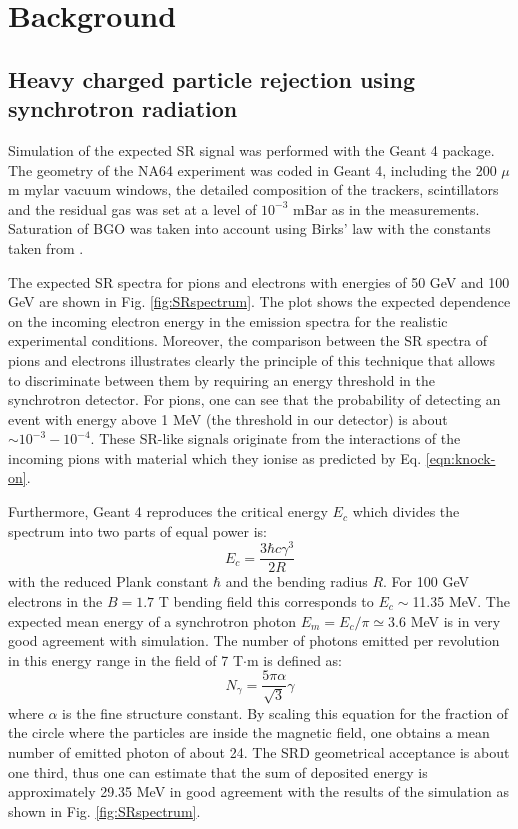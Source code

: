 \section{Background}
\label{ch3:sec:bkg}

\subsection{Heavy charged particle rejection using synchrotron radiation}
\label{ch3:sec:bkg-srd}

Simulation of the expected SR signal was performed with the Geant 4 package\cite{ALLISON2016186,1610988,AGOSTINELLI2003250}.
The geometry of the NA64 experiment was coded in Geant 4, including the 200 $\mu$m mylar vacuum windows, the detailed composition of the trackers, scintillators and the residual gas was set at a level of $10^{-3}$ mBar as in the measurements. Saturation of BGO was taken into account using Birks' law with the constants taken from \cite{AVDEICHIKOV2002251}.

The expected SR spectra for pions and electrons with energies of 50 GeV and 100 GeV are shown in Fig. \ref{fig:SRspectrum}. The plot shows the expected dependence on the incoming electron energy in the emission spectra for the realistic experimental conditions.
Moreover, the comparison between the SR spectra of pions and electrons illustrates clearly the principle of this technique that allows to discriminate between them by requiring an energy threshold in the synchrotron detector. 
For pions, one can see that the probability of detecting an event with energy above 1 MeV (the threshold in our detector) is about $\sim 10^{-3}-10^{-4}$.
These SR-like signals originate from the interactions of the incoming pions with material which they ionise as predicted by Eq. \ref{eqn:knock-on}.
 \par 
Furthermore, Geant 4 reproduces the critical energy $E_c$ which divides the spectrum into two parts of equal power is:
\begin{equation}
E_c = \frac{3 \hbar c \gamma^3}{2R}
\end{equation}
with the reduced Plank constant $\hbar$ and the bending radius $R$. 
 For 100 GeV electrons in the  $B=1.7$ T bending field this corresponds to $E_c\sim$11.35 MeV. The expected mean energy of a synchrotron photon $E_m=E_c/\pi\simeq 3.6$ MeV is in very good agreement with simulation. The number of photons emitted per revolution in this energy range in the field of 7 T$\cdot$m is defined as:
\begin{equation}
N_\gamma = \frac{5 \pi \alpha}{\sqrt{3}}\gamma
\end{equation}
where $\alpha$ is the fine structure constant. 
By scaling this equation for the fraction of the circle where the particles are inside the magnetic field, one obtains a mean number of emitted photon of about 24.
The SRD geometrical acceptance is about one third,  thus one can estimate that the sum of deposited energy is approximately 29.35 MeV in good agreement with the results of the simulation as shown in Fig. \ref{fig:SRspectrum}. 
 
